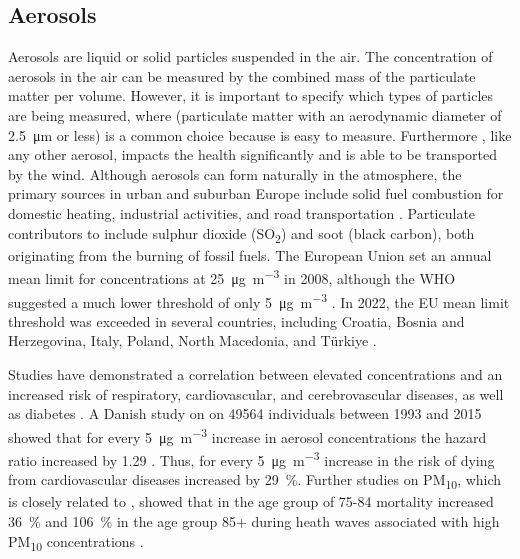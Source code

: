 \subsection{Aerosols}
Aerosols are liquid or solid particles suspended in the air. The concentration of aerosols in the air can be measured by the combined mass of the particulate matter per volume. However, it is important to specify which types of particles are being measured, where \PM(particulate matter with an aerodynamic diameter of \SI{2.5}{\micro\meter} or less) is a common choice because \PM is easy to measure. Furthermore \PM, like any other aerosol, impacts the health significantly and is able to be transported by the wind. Although aerosols can form naturally in the atmosphere, the primary sources in urban and suburban Europe include solid fuel combustion for domestic heating, industrial activities, and road transportation \cite{europeanenvironmentagencyEuropesAirQuality2024}. Particulate contributors to \PM include sulphur dioxide (SO\textsubscript{2}) and soot (black carbon), both originating from the burning of fossil fuels. The European Union set an annual mean limit for \PM concentrations at \SI{25}{\micro\gram\per\cubic\meter} in 2008, although the WHO suggested a much lower threshold of only \SI{5}{\micro\gram\per\cubic\meter} \cite{europeanenvironmentagencyEuropesAirQuality2024}. In 2022, the EU mean limit threshold was exceeded in several countries, including Croatia, Bosnia and Herzegovina, Italy, Poland, North Macedonia, and Türkiye \cite{europeanenvironmentagencyEuropesAirQuality2024}. 

Studies have demonstrated a correlation between elevated \PM concentrations and an increased risk of respiratory, cardiovascular, and cerebrovascular diseases, as well as diabetes \cite{sharmaHealthEffectsAssociated2020}. A Danish study on on \SI{49564}{} individuals between 1993 and 2015 showed that for every \SI{5}{\micro\gram\per
\m\cubed} increase in aerosol concentrations the hazard ratio increased by 1.29 \cite{hvidtfeldtLongtermResidentialExposure2019}. Thus, for every \SI{5}{\micro\gram\per
\m\cubed} increase in \PM the risk of dying from cardiovascular diseases increased by \SI{29}{\%}. Further studies on PM\textsubscript{10}, which is closely related to \PM, showed that in the age group of 75-84 mortality increased \SI{36}{\%} and \SI{106}{\%} in the age group 85+ during heath waves associated with high PM\textsubscript{10} concentrations \cite{analitisEffectsHeatWaves2014}.  


